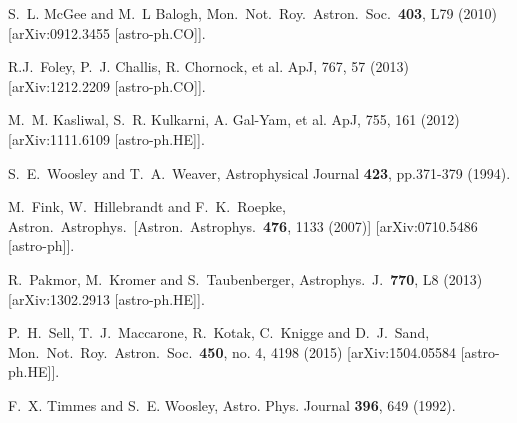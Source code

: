   S.~L. McGee and M.~L Balogh,
  Mon.\ Not.\ Roy.\ Astron.\ Soc.\  {\bf 403}, L79 (2010)
  [arXiv:0912.3455 [astro-ph.CO]].

  R.J.~Foley, P.~J. Challis, R. Chornock, et al.
  ApJ, 767, 57 (2013)
  [arXiv:1212.2209 [astro-ph.CO]].

  M.~M. Kasliwal, S.~R. Kulkarni, A. Gal-Yam, et al.
  ApJ, 755, 161 (2012)
  [arXiv:1111.6109 [astro-ph.HE]].

  S.~E.~Woosley and T.~A.~Weaver, Astrophysical Journal {\bf 423}, pp.371-379 (1994).

  M.~Fink, W.~Hillebrandt and F.~K.~Roepke,
  Astron.\ Astrophys.\ 
  [Astron.\ Astrophys.\  {\bf 476}, 1133 (2007)]
  [arXiv:0710.5486 [astro-ph]].


  R.~Pakmor, M.~Kromer and S.~Taubenberger,
  Astrophys.\ J.\  {\bf 770}, L8 (2013)
  [arXiv:1302.2913 [astro-ph.HE]].


  P.~H.~Sell, T.~J.~Maccarone, R.~Kotak, C.~Knigge and D.~J.~Sand,
  Mon.\ Not.\ Roy.\ Astron.\ Soc.\  {\bf 450}, no. 4, 4198 (2015)
  [arXiv:1504.05584 [astro-ph.HE]].


 F.~X. Timmes and S.~E. Woosley, 
 Astro. Phys. Journal {\bf 396}, 649 (1992).

